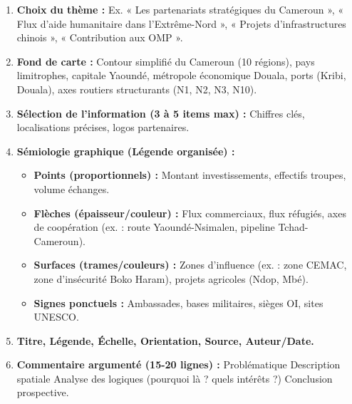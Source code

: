 \documentclass[11pt]{article}
\begin{document}
\begin{methode}
\begin{enumerate}
    \item \textbf{Choix du thème :} Ex. « Les partenariats stratégiques du Cameroun », « Flux d'aide humanitaire dans l'Extrême-Nord », « Projets d'infrastructures chinois », « Contribution aux OMP ».
    \item \textbf{Fond de carte :} Contour simplifié du Cameroun (10 régions), pays limitrophes, capitale Yaoundé, métropole économique Douala, ports (Kribi, Douala), axes routiers structurants (N1, N2, N3, N10).
    \item \textbf{Sélection de l'information (3 à 5 items max) :} Chiffres clés, localisations précises, logos partenaires.
    \item \textbf{Sémiologie graphique (Légende organisée) :}
    \begin{itemize}
        \item \textbf{Points (proportionnels) :} Montant investissements, effectifs troupes, volume échanges.
        \item   \textbf{Flèches (épaisseur/couleur) :} Flux commerciaux, flux réfugiés, axes de coopération (ex. : route Yaoundé-Nsimalen, pipeline Tchad-Cameroun).
        \item   \textbf{Surfaces (trames/couleurs) :} Zones d'influence (ex. : zone CEMAC, zone d'insécurité Boko Haram), projets agricoles (Ndop, Mbé).
        \item   \textbf{Signes ponctuels :} Ambassades, bases militaires, sièges OI, sites UNESCO.
    \end{itemize}
    \item \textbf{Titre, Légende, Échelle, Orientation, Source, Auteur/Date.}
    \item \textbf{Commentaire argumenté (15-20 lignes) :} Problématique \rightarrow Description spatiale \rightarrow Analyse des logiques (pourquoi là ? quels intérêts ?) \rightarrow Conclusion prospective.
\end{enumerate}
\end{methode}
\end{document}
